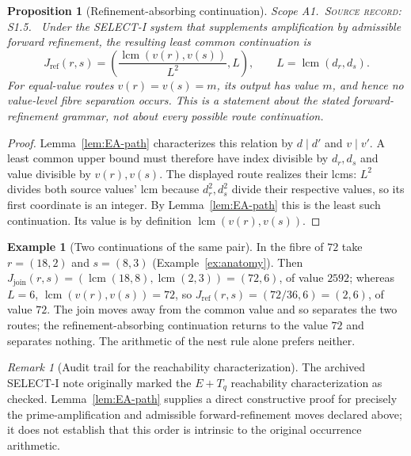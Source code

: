 \documentclass[11pt,oneside,openany]{book}
\newtheorem{proposition}[theorem]{Proposition}
\theoremstyle{definition}
\newtheorem{example}[theorem]{Example}
\theoremstyle{remark}
\newtheorem{remark}[theorem]{Remark}
\newcommand{\lcmop}{\operatorname{lcm}}
\newcommand{\scope}[1]{\textsf{\small Scope #1.}\ }
\newcommand{\record}[1]{\textup{\textsc{Source record: #1.}}\ }
\newcommand{\join}{J_{\mathrm{join}}}
\newcommand{\jref}{J_{\mathrm{ref}}}
\begin{document}
\begin{proposition}[Refinement-absorbing continuation]\label{prop:jref}
\scope{A1}\record{S1.5} Under the SELECT-I system that supplements amplification by admissible forward refinement, the resulting least common continuation is
\[
 \jref(r,s)=\left(\frac{\lcmop(v(r),v(s))}{L^2},L\right),
 \qquad L=\lcmop(d_r,d_s).
\]
For equal-value routes \(v(r)=v(s)=m\), its output has value \(m\), and hence no value-level fibre separation occurs. This is a statement about the stated forward-refinement grammar, not about every possible route continuation.
\end{proposition}
\begin{proof}
Lemma~\ref{lem:EA-path} characterizes this relation by \(d\mid d'\) and \(v\mid v'\). A least common upper bound must therefore have index divisible by \(d_r,d_s\) and value divisible by \(v(r),v(s)\). The displayed route realizes their lcms: \(L^2\) divides both source values' lcm because \(d_r^2,d_s^2\) divide their respective values, so its first coordinate is an integer. By Lemma~\ref{lem:EA-path} this is the least such continuation. Its value is by definition \(\lcmop(v(r),v(s))\).
\end{proof}
\begin{example}[Two continuations of the same pair]\label{ex:two-joins}
In the fibre of \(72\) take \(r=(18,2)\) and \(s=(8,3)\) (Example~\ref{ex:anatomy}). Then \(\join(r,s)=(\lcmop(18,8),\lcmop(2,3))=(72,6)\), of value \(2592\); whereas \(L=6\), \(\lcmop(v(r),v(s))=72\), so \(\jref(r,s)=(72/36,6)=(2,6)\), of value \(72\). The join moves away from the common value and so separates the two routes; the refinement-absorbing continuation returns to the value \(72\) and separates nothing. The arithmetic of the nest rule alone prefers neither.
\end{example}

\begin{remark}[Audit trail for the reachability characterization]
The archived SELECT-I note originally marked the $E+T_q$ reachability characterization as checked. Lemma~\ref{lem:EA-path} supplies a direct constructive proof for precisely the prime-amplification and admissible forward-refinement moves declared above; it does not establish that this order is intrinsic to the original occurrence arithmetic.
\end{remark}
\end{document}
